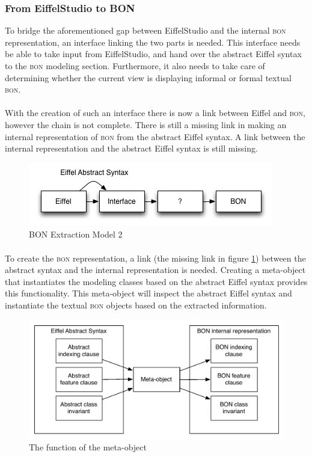 \subsubsection{From EiffelStudio to BON}
To bridge the aforementioned gap between EiffelStudio and the internal \textsc{bon} representation, an interface linking the two parts is needed. This interface needs be able to take input from EiffelStudio, and hand over the abstract Eiffel syntax to the \textsc{bon} modeling section. Furthermore, it also needs to take care of determining whether the current view is displaying informal or formal textual \textsc{bon}.

\paragraph{}
With the creation of such an interface there is now a link between Eiffel and \textsc{bon}, however the chain is not complete. There is still a missing link in making an internal representation of \textsc{bon} from the abstract Eiffel syntax. A link between the internal representation and the abstract Eiffel syntax is still missing.
\begin{figure}[H]
\centering
\includegraphics[scale=0.8]{images/BON-extraction-model-2.png}
\caption{BON Extraction Model 2}
\label{fig:bon_extraction_2}
\end{figure}

\paragraph{}
To create the \textsc{bon} representation, a link (the missing link in figure \ref{fig:bon_extraction_2}) between the abstract syntax and the internal representation is needed. Creating a meta-object that instantiates the modeling classes based on the abstract Eiffel syntax provides this functionality. This meta-object will inspect the abstract Eiffel syntax and instantiate the textual \textsc{bon} objects based on the extracted information.

\begin{figure}[H]
\centering
\includegraphics[scale=0.8]{images/metaobject.pdf}
\caption{The function of the \bon{} meta-object}
\label{fig:bon-meta-object}
\end{figure}

